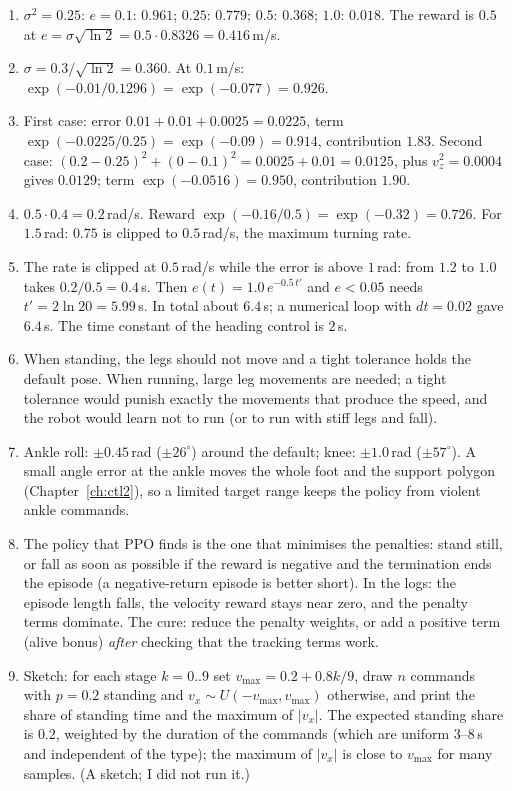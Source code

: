 \begin{enumerate}[label=\textbf{\ansnum.\arabic*}]
  \item $\sigma^2=0.25$: $e=0.1$: $0.961$; $0.25$: $0.779$; $0.5$: $0.368$; $1.0$: $0.018$. The reward is $0.5$ at $e=\sigma\sqrt{\ln2}=0.5\cdot0.8326=0.416$\,m/s.
  \item $\sigma=0.3/\sqrt{\ln2}=0.360$. At $0.1$\,m/s: $\exp(-0.01/0.1296)=\exp(-0.077)=0.926$.
  \item First case: error $0.01+0.01+0.0025=0.0225$, term $\exp(-0.0225/0.25)=\exp(-0.09)=0.914$, contribution $1.83$. Second case: $(0.2-0.25)^2+(0-0.1)^2=0.0025+0.01=0.0125$, plus $v_z^2=0.0004$ gives $0.0129$; term $\exp(-0.0516)=0.950$, contribution $1.90$.
  \item $0.5\cdot0.4=0.2$\,rad/s. Reward $\exp(-0.16/0.5)=\exp(-0.32)=0.726$. For $1.5$\,rad: $0.75$ is clipped to $0.5$\,rad/s, the maximum turning rate.
  \item The rate is clipped at $0.5$\,rad/s while the error is above $1$\,rad: from $1.2$ to $1.0$ takes $0.2/0.5=0.4$\,s. Then $e(t)=1.0\,e^{-0.5\,t'}$ and $e<0.05$ needs $t'=2\ln20=5.99$\,s. In total about $6.4$\,s; a numerical loop with $dt=0.02$ gave $6.4$\,s. The time constant of the heading control is $2$\,s.
  \item When standing, the legs should not move and a tight tolerance holds the default pose. When running, large leg movements are needed; a tight tolerance would punish exactly the movements that produce the speed, and the robot would learn not to run (or to run with stiff legs and fall).
  \item Ankle roll: $\pm0.45$\,rad ($\pm26^{\circ}$) around the default; knee: $\pm1.0$\,rad ($\pm57^{\circ}$). A small angle error at the ankle moves the whole foot and the support polygon (Chapter~\ref{ch:ctl2}), so a limited target range keeps the policy from violent ankle commands.
  \item The policy that PPO finds is the one that minimises the penalties: stand still, or fall as soon as possible if the reward is negative and the termination ends the episode (a negative-return episode is better short). In the logs: the episode length falls, the velocity reward stays near zero, and the penalty terms dominate. The cure: reduce the penalty weights, or add a positive term (alive bonus) \emph{after} checking that the tracking terms work.
  \item Sketch: for each stage $k=0..9$ set $v_{\max}=0.2+0.8k/9$, draw $n$ commands with $p=0.2$ standing and $v_x\sim U(-v_{\max},v_{\max})$ otherwise, and print the share of standing time and the maximum of $|v_x|$. The expected standing share is $0.2$, weighted by the duration of the commands (which are uniform $3$--$8$\,s and independent of the type); the maximum of $|v_x|$ is close to $v_{\max}$ for many samples. (A sketch; I did not run it.)

\end{enumerate}
